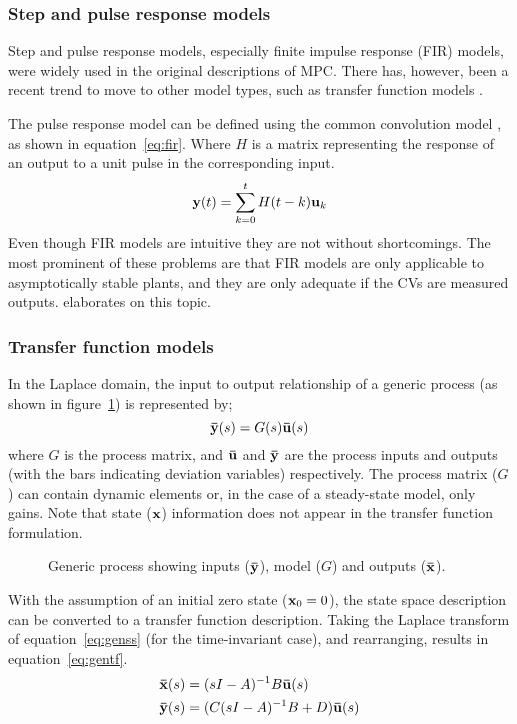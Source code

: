 \subsubsection{Step and pulse response models}
Step and pulse response models, especially finite impulse response (FIR) models, were widely used in the original descriptions of MPC.
There has, however, been a recent trend to move to other model types, such as transfer function models .

The pulse response model can be defined using the common convolution model \citep[284]{luyben}, as shown in equation~\ref{eq:fir}.
Where $H$ is a matrix representing the response of an output to a unit pulse in the corresponding input.
\begin{equation}
  \label{eq:fir}
  {\bf {y}}(t) = \sum^t_{k=0}H(t-k){\bf {u}}_k
\end{equation} 
Even though FIR models are intuitive they are not without shortcomings.
The most prominent of these problems are that FIR models are only applicable to asymptotically stable plants, and they are only adequate if the CVs are measured outputs.
\citet[109]{maciejowskimpc} elaborates on this topic.

\subsubsection{Transfer function models}
In the Laplace domain, the input to output relationship of a generic process (as shown in figure~\ref{fig:genmodel}) is represented by;
\begin{equation*}
  {\bf {\bar y}}(s)=G(s){\bf {\bar u}}(s)
\end{equation*}
where $G$ is the process matrix, and ${\bf {\bar u}}$ and ${\bf {\bar y}}$ are the process inputs and outputs (with the bars indicating deviation variables) respectively.
The process matrix ($G$) can contain dynamic elements or, in the case of a steady-state model, only gains.
Note that state (${\bf {x}}$) information does not appear in the transfer function formulation.
\begin{figure}[htbp]
  \centering
  \scalebox{1}{}
  \caption[Generic input to output model]{Generic process showing inputs (${\bf {\bar y}}$), model ($G$) and outputs (${\bf {\bar x}}$).}
  \label{fig:genmodel}
\end{figure}

With the assumption of an initial zero state (${\bf {x}}_0=0$), the state space description can be converted to a transfer function description.
Taking the Laplace transform of equation~\ref{eq:genss} (for the time-invariant case), and rearranging, results in equation~\ref{eq:gentf}.
\begin{align}
  \label{eq:gentf}
    {\bf {\bar x}}(s) &= (sI-A)^{-1}B{\bf {\bar u}}(s) \\
    {\bf {\bar y}}(s) &= (C(sI-A)^{-1}B+D){\bf {\bar u}}(s) \notag
\end{align} 
